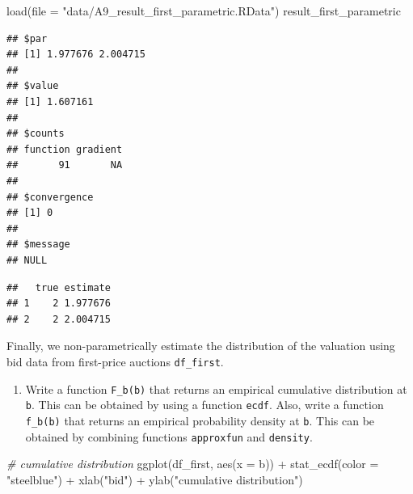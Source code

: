 \documentclass[
]{book}
\newenvironment{Shaded}{\begin{snugshade}}{\end{snugshade}}
\newcommand{\AttributeTok}[1]{\textcolor[rgb]{0.77,0.63,0.00}{#1}}
\newcommand{\CommentTok}[1]{\textcolor[rgb]{0.56,0.35,0.01}{\textit{#1}}}
\newcommand{\FunctionTok}[1]{\textcolor[rgb]{0.00,0.00,0.00}{#1}}
\newcommand{\NormalTok}[1]{#1}
\newcommand{\OtherTok}[1]{\textcolor[rgb]{0.56,0.35,0.01}{#1}}
\newcommand{\SpecialCharTok}[1]{\textcolor[rgb]{0.00,0.00,0.00}{#1}}
\newcommand{\StringTok}[1]{\textcolor[rgb]{0.31,0.60,0.02}{#1}}
\providecommand{\tightlist}{%
  \setlength{\itemsep}{0pt}\setlength{\parskip}{0pt}}
\begin{document}
\begin{Shaded}
\begin{Highlighting}[]
\FunctionTok{load}\NormalTok{(}\AttributeTok{file =} \StringTok{"data/A9\_result\_first\_parametric.RData"}\NormalTok{)}
\NormalTok{result\_first\_parametric}
\end{Highlighting}
\end{Shaded}

\begin{verbatim}
## $par
## [1] 1.977676 2.004715
## 
## $value
## [1] 1.607161
## 
## $counts
## function gradient 
##       91       NA 
## 
## $convergence
## [1] 0
## 
## $message
## NULL
\end{verbatim}

\begin{Shaded}
\end{Shaded}

\begin{verbatim}
##   true estimate
## 1    2 1.977676
## 2    2 2.004715
\end{verbatim}

Finally, we non-parametrically estimate the distribution of the valuation using bid data from first-price auctions \texttt{df\_first}.

\begin{enumerate}
\def\labelenumi{\arabic{enumi}.}
\setcounter{enumi}{9}
\tightlist
\item
  Write a function \texttt{F\_b(b)} that returns an empirical cumulative distribution at \texttt{b}. This can be obtained by using a function \texttt{ecdf}.
  Also, write a function \texttt{f\_b(b)} that returns an empirical probability density at \texttt{b}. This can be obtained by combining functions \texttt{approxfun} and \texttt{density}.
\end{enumerate}

\begin{Shaded}
\begin{Highlighting}[]
\CommentTok{\# cumulative distribution}
\FunctionTok{ggplot}\NormalTok{(df\_first, }\FunctionTok{aes}\NormalTok{(}\AttributeTok{x =}\NormalTok{ b)) }\SpecialCharTok{+} \FunctionTok{stat\_ecdf}\NormalTok{(}\AttributeTok{color =} \StringTok{"steelblue"}\NormalTok{) }\SpecialCharTok{+}
  \FunctionTok{xlab}\NormalTok{(}\StringTok{"bid"}\NormalTok{) }\SpecialCharTok{+} \FunctionTok{ylab}\NormalTok{(}\StringTok{"cumulative distribution"}\NormalTok{)}
\end{Highlighting}
\end{Shaded}
\end{document}
